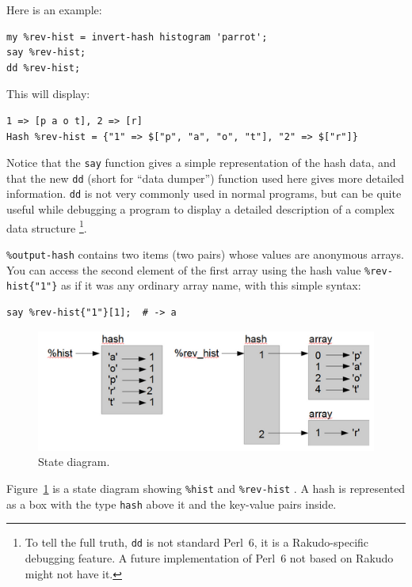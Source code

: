 Here is an example:

\begin{verbatim}
my %rev-hist = invert-hash histogram 'parrot';
say %rev-hist;
dd %rev-hist;
\end{verbatim}

This will display:

\begin{verbatim}
1 => [p a o t], 2 => [r]
Hash %rev-hist = {"1" => $["p", "a", "o", "t"], "2" => $["r"]}
\end{verbatim}

Notice that the {\tt say} function gives a simple representation 
of the hash data, and that the new {\tt dd} (short for ``data 
dumper'') function used here gives more detailed information. 
{\tt dd} is not very commonly used in normal programs, but 
can be quite useful while debugging a program to display a 
detailed description of a complex data structure 
\footnote{To tell the full truth, {\tt dd} is not standard 
Perl~6, it is a Rakudo-specific debugging feature. A future 
implementation of Perl~6 not based on Rakudo might not have 
it.}.

\verb'%output-hash' contains two items (two pairs) whose 
values are anonymous arrays. You can access the second 
element of the first array using the hash value 
\verb'%rev-hist{"1"}' as if it was any ordinary array name, 
with this simple syntax:

\begin{verbatim}
say %rev-hist{"1"}[1];  # -> a
\end{verbatim}


\begin{figure}
\centerline
{\includegraphics[scale=0.8]{figs/hash1.png}}
\caption{State diagram.}
\label{fig.hash1}
\end{figure}

Figure~\ref{fig.hash1} is a state diagram showing \verb'%hist'  and \verb'%rev-hist' .
A hash is represented as a box with the type {\tt hash} above it
and the key-value pairs inside.

